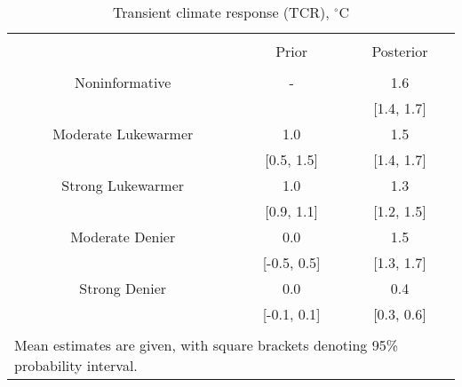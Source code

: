 
\begin{table}[!htbp] \centering 
  \caption{Transient climate response (TCR), $^\circ$C} 
  \label{tab:tcr-tab} 
\begin{tabular}{@{\extracolsep{5pt}} ccc} 
\\[-1.8ex]\hline 
\hline \\[-1.8ex] 
 & Prior & Posterior \\ 
\hline \\[-1.8ex] 
Noninformative & - & 1.6 \\ 
 &  & [1.4, 1.7] \\ 
Moderate Lukewarmer & 1.0 & 1.5 \\ 
 & [0.5, 1.5] & [1.4, 1.7] \\ 
Strong Lukewarmer & 1.0 & 1.3 \\ 
 & [0.9, 1.1] & [1.2, 1.5] \\ 
Moderate Denier & 0.0 & 1.5 \\ 
 & [-0.5, 0.5] & [1.3, 1.7] \\ 
Strong Denier & 0.0 & 0.4 \\ 
 & [-0.1, 0.1] & [0.3, 0.6] \\ 
\hline \\[-1.8ex] 
\multicolumn{3}{l}{\footnotesize Mean estimates are given, with square brackets denoting 95\% probability interval.} \\ 
\end{tabular} 
\end{table} 

